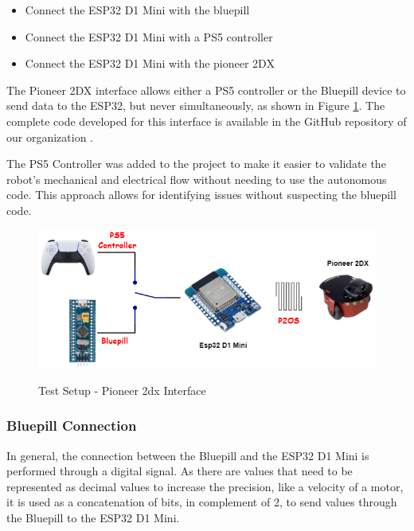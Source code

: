 \documentclass[../../monografia.tex]{subfiles}
\begin{document}
\begin{itemize}
    \item {Connect the ESP32 D1 Mini with the bluepill}
    \item {Connect the ESP32 D1 Mini with a PS5 controller \cite{dualSenseController_2024}}
    \item {Connect the ESP32 D1 Mini with the pioneer 2DX}
\end{itemize}

The Pioneer 2DX interface allows either a PS5 controller \cite{dualSenseController_2024} or the Bluepill device to send data to the ESP32, but never simultaneously, as shown in Figure \ref{fig: Test Setup - Pioneer 2dx Interface}. The complete code developed for this interface is available in the GitHub repository of our organization \cite{pioneer_2dx_interface_esp32_2024}.


The PS5 Controller was added to the project to make it easier to validate the robot's mechanical and electrical flow without needing to use the autonomous code. This approach allows for identifying issues without suspecting the bluepill code.

\begin{figure}[h!]
    \caption{Test Setup - Pioneer 2dx Interface}
    \centering
    \includegraphics[width=16cm]{diagramas-test_setup-pioneer_2dx_interface.drawio.png}
    \label{fig: Test Setup - Pioneer 2dx Interface}
\end{figure}

\subsubsection{Bluepill Connection}
\label{Bluepill Connection}

In general, the connection between the Bluepill and the ESP32 D1 Mini is performed through a digital signal. As there are values that need to be represented as decimal values to increase the precision, like a velocity of a motor, it is used as a concatenation of bits, in complement of 2, to send values through the Bluepill to the ESP32 D1 Mini.
\end{document}
